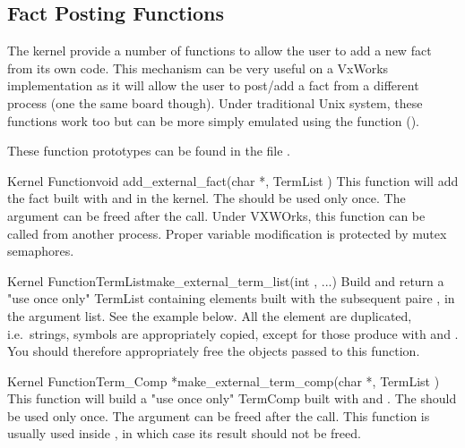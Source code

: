 \subsection{Fact Posting Functions}

The kernel provide a number of functions to allow the user to add a new fact
from its own code. This mechanism can be very useful on a VxWorks
implementation as it will allow the user to post/add a fact from a different
process (one the same board though). Under traditional Unix system, these
functions work too but can be more simply emulated using the
 function ().


These function prototypes can be found in the file
.

\begin{typefn}{Kernel Function}{void }{add\_external\_fact}{(char *, TermList
)} This function will add the fact built with 
and  in the  kernel. The 
should be used only once. The  argument can be freed after the
call. Under VXWOrks, this function can be called from another process. Proper
variable modification is protected by mutex semaphores.
\end{typefn}

\begin{typefn}{Kernel Function}{TermList}{make\_external\_term\_list}{(int ,
...)}  Build and return a "use once only" TermList containing 
elements built with the subsequent paire ,  in the
argument list. See the example below. All the element are duplicated,
i.e.\ strings, symbols are appropriately copied, except for those produce with
 and . You should
therefore appropriately free the objects passed to this function.
\end{typefn}

\begin{typefn}{Kernel Function}{Term\_Comp *}{make\_external\_term\_comp}{(char
*, TermList )} This function will build a "use
once only" TermComp built with  and . The
 should be used only once. The  argument can be
freed after the call. This function is usually used inside
, in which case its result should not be freed.
\end{typefn}

